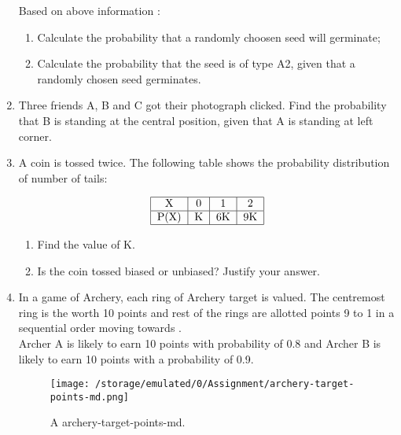 \documentclass[a4paper,12pt]{article}
\begin{document}
\begin{enumerate}
Based on above information :\

\begin{enumerate}
\item Calculate the probability that a randomly choosen seed will germinate; 

\item Calculate the probability that the seed is of type A2, given that a randomly chosen seed germinates.

\end{enumerate}
 
\item Three friends A, B and C got their photograph clicked. Find the probability that B is standing at the central position, given that A is standing at left corner. 

\item A coin is tossed twice. The following table shows the probability distribution of number of tails:

$$\begin{tabular}{|c|c|c|c|}
\hline
X & 0 & 1 & 2 \\
\hline
P(X) & K & 6K & 9K \\
\hline 

\end{tabular}$$

\begin{enumerate}
\item Find the value of K. 

\item Is the coin tossed biased or unbiased? Justify your answer.

\end{enumerate}

\item In a game of Archery, each ring of Archery target is valued. The centremost ring is the worth 10 points and rest of the rings are allotted points 9 to 1 in a sequential order moving towards .\\
Archer A is likely to earn 10 points with probability of 0.8 and Archer B is likely to earn 10 points with a probability of 0.9.\\

\begin{figure}[h!]
  \centering
  \texttt{[image:  /storage/emulated/0/Assignment/archery-target-points-md.png]}
  \caption{A archery-target-points-md.}
  \label{fig:archery-target-points-md}
\end{figure}


\end{enumerate}
\end{document}
